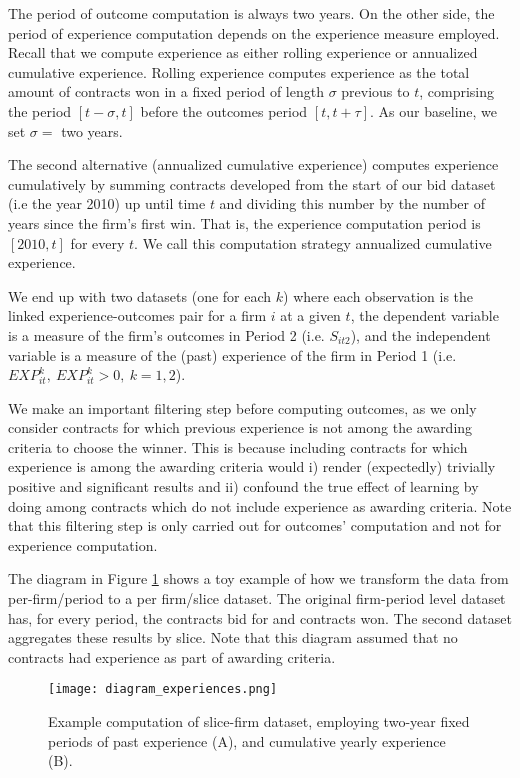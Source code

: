 The period of outcome computation is always two years. On the other side, the period of experience computation depends on the experience measure employed. Recall that we compute experience as either rolling experience or annualized cumulative experience. Rolling experience computes experience as the total amount of contracts won in a fixed period of length $\sigma$ previous to $t$, comprising the period $[t-\sigma,t]$ before the outcomes period $[t,t+\tau]$. As our baseline, we set $\sigma=$ two years.

The second alternative (annualized cumulative experience) computes experience cumulatively by summing contracts developed from the start of our bid dataset (i.e the year 2010) up until time $t$ and dividing this number by the number of years since the firm's first win. That is, the experience computation period is $[2010, t]$ for every $t$.  We call this computation strategy annualized cumulative experience.

We end up with two datasets (one for each $k$) where each observation is the linked experience-outcomes pair for a firm $i$ at a given $t$, the dependent variable is a measure of the firm’s outcomes in Period 2 (i.e. $S_{it2}$), and the independent variable is a measure of the (past) experience of the firm in Period 1 (i.e. $EXP^k_{it},\  EXP^k_{it}>0,\ k=1,2$).

We make an important filtering step before computing outcomes, as we only consider contracts for which previous experience is not among the awarding criteria to choose the winner. This is because including contracts for which experience is among the awarding criteria would i) render (expectedly) trivially positive and significant results and ii) confound the true effect of learning by doing among contracts which do not include experience as awarding criteria. Note that this filtering step is only carried out for outcomes' computation and not for experience computation.

The diagram in Figure \ref{fig:diagram_experience} shows a toy example of how we transform the data from per-firm/period to a per firm/slice dataset. The original firm-period level dataset has, for every period, the contracts bid for and contracts won. The second dataset aggregates these results by slice. Note that this diagram assumed that no contracts had experience as part of awarding criteria.

\begin{figure}
  \texttt{[image: diagram\_experiences.png]}
  \caption{Example computation of slice-firm dataset, employing two-year fixed periods of past experience (A), and cumulative yearly experience (B).}
  \label{fig:diagram_experience}
  \vskip 0.5mm
  { \footnotesize  }
\end{figure}


